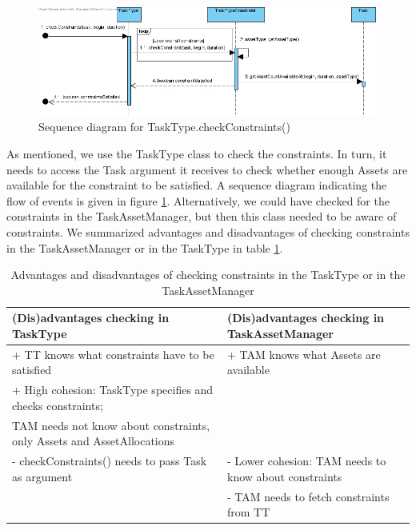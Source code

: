 						\begin{figure}
			\includegraphics[scale=0.5]{images/checkConstraints().jpg}
			\caption{Sequence diagram for TaskType.checkConstraints()}
						\label{checkConstraints}
			\end{figure}
			
			As mentioned, we use the TaskType class to check the constraints. In turn, it needs to access the Task argument it receives to check whether enough Assets are available for the constraint to be satisfied. A sequence diagram indicating the flow of events is given in figure \ref{checkConstraints}. Alternatively, we could have checked for the constraints in the TaskAssetManager, but then this class needed to be aware of constraints. We summarized advantages and disadvantages of checking constraints in the TaskAssetManager or in the TaskType in table \ref{TaskType Tam}.
						
			\begin{table}
			\begin{tabular}{|p{7cm}|p{5cm}|}
				\hline
				(Dis)advantages checking in TaskType & (Dis)advantages checking in TaskAssetManager\\
				\hline
				
				+ TT knows what constraints have to be satisfied & + TAM knows what Assets are available\\
				+ High cohesion: TaskType specifies and checks constraints;&\\ 
					TAM needs not know about constraints, only Assets and AssetAllocations& \\
				\hline
				- checkConstraints() needs to pass Task as argument & - Lower cohesion: TAM needs to know about constraints\\
				& - TAM needs to fetch constraints from TT\\
				\hline
			\end{tabular}
			\caption{Advantages and disadvantages of checking constraints in the TaskType or in the TaskAssetManager}
						\label{TaskType Tam}
			\end{table}
			

